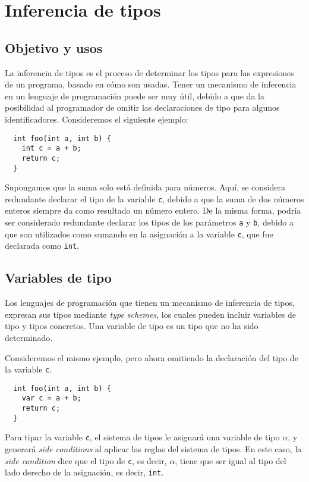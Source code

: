 \section{Inferencia de tipos}
\subsection{Objetivo y usos}
La inferencia de tipos es el proceso de determinar los tipos para las expresiones de un programa, basado en cómo son usadas. Tener un mecanismo de inferencia en un lenguaje de programación puede ser muy útil, debido a que da la posibilidad al programador de omitir las declaraciones de tipo para algunos identificadores. Consideremos el siguiente ejemplo:

\begin{lstlisting}
  int foo(int a, int b) {
    int c = a + b;
    return c;
  }
\end{lstlisting}

Supongamos que la suma solo está definida para números. Aquí, se considera redundante declarar el tipo de la variable \texttt{c}, debido a que la suma de dos números enteros siempre da como resultado un número entero. De la misma forma, podría ser considerado redundante declarar los tipos de los parámetros \texttt{a} y \texttt{b}, debido a que son utilizados como sumando en la asignación a la variable \texttt{c}, que fue declarada como \texttt{int}.

\subsection{Variables de tipo}
Los lenguajes de programación que tienen un mecanismo de inferencia de tipos, expresan sus tipos mediante \textit{type schemes}, los cuales pueden incluir variables de tipo y tipos concretos. Una variable de tipo es un tipo que no ha sido determinado.

Consideremos el mismo ejemplo, pero ahora omitiendo la declaración del tipo de la variable \texttt{c}.

\begin{lstlisting}
  int foo(int a, int b) {
    var c = a + b;
    return c;
  }
\end{lstlisting}

Para tipar la variable \texttt{c}, el sistema de tipos le asignará una variable de tipo $\alpha$, y generará \textit{side conditions} al aplicar las reglas del sistema de tipos. En este caso, la \textit{side condition} dice que el tipo de \texttt{c}, es decir, $\alpha$, tiene que ser igual al tipo del lado derecho de la asignación, es decir, \texttt{int}.

